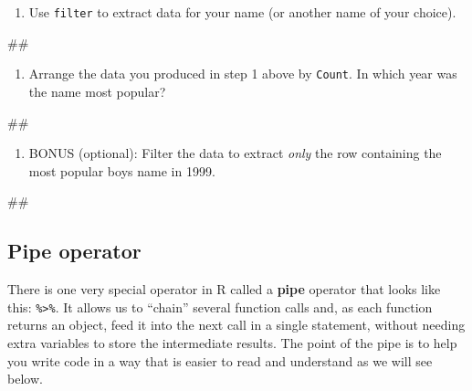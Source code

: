 \documentclass[]{book}
\newenvironment{Shaded}{\begin{snugshade}}{\end{snugshade}}
\newcommand{\NormalTok}[1]{#1}
\providecommand{\tightlist}{%
  \setlength{\itemsep}{0pt}\setlength{\parskip}{0pt}}
\begin{document}
\begin{enumerate}
\def\labelenumi{\arabic{enumi}.}
\tightlist
\item
  Use \texttt{filter} to extract data for your name (or another name of
  your choice).
\end{enumerate}

\begin{Shaded}
\begin{Highlighting}[]
\NormalTok{##}
\end{Highlighting}
\end{Shaded}

\begin{enumerate}
\def\labelenumi{\arabic{enumi}.}
\setcounter{enumi}{1}
\tightlist
\item
  Arrange the data you produced in step 1 above by \texttt{Count}. In
  which year was the name most popular?
\end{enumerate}

\begin{Shaded}
\begin{Highlighting}[]
\NormalTok{##}
\end{Highlighting}
\end{Shaded}

\begin{enumerate}
\def\labelenumi{\arabic{enumi}.}
\setcounter{enumi}{2}
\tightlist
\item
  BONUS (optional): Filter the data to extract \emph{only} the row
  containing the most popular boys name in 1999.
\end{enumerate}

\begin{Shaded}
\begin{Highlighting}[]
\NormalTok{##}
\end{Highlighting}
\end{Shaded}

\subsection{Pipe operator}\label{pipe-operator}

There is one very special operator in R called a \textbf{pipe} operator
that looks like this: \texttt{\%\textgreater{}\%}. It allows us to
``chain'' several function calls and, as each function returns an
object, feed it into the next call in a single statement, without
needing extra variables to store the intermediate results. The point of
the pipe is to help you write code in a way that is easier to read and
understand as we will see below.
\end{document}
